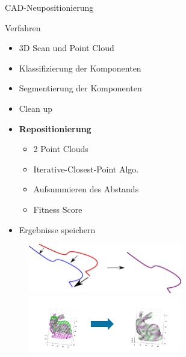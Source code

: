 \begin{frame}{CAD-Neupositionierung}
    \begin{minipage}[]{0.49\textwidth}
    \begin{block}{Verfahren}
        \begin{itemize}
            \item 3D Scan und Point Cloud
            \item Klassifizierung der Komponenten
            \item Segmentierung der Komponenten
            \item Clean up
            \item \textbf{Repositionierung}
            \begin{itemize}
                \item 2 Point Clouds
                \item Iterative-Closest-Point Algo.
                \item Aufsummieren des Abstands
                \item Fitness Score
            \end{itemize}
            \item Ergebnisse speichern
        \end{itemize}
    \end{block}
    \end{minipage}
    \begin{minipage}[]{0.49\textwidth}
      \begin{figure}
          \includegraphics[width=190pt]{img_niklas/1200px-Idea_closest_point_algorithm.svg.png}
          \includegraphics[width=190pt]{img_niklas/icp_3d.png}
          \label{fig:my_label}
      \end{figure}
    \end{minipage}
\end{frame}

